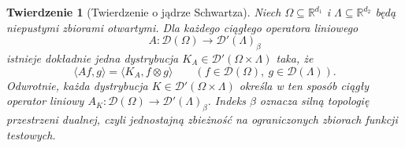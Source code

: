 \documentclass[11pt,a4paper]{article}
\numberwithin{equation}{section}
\theoremstyle{plain}
\newtheorem{twierdzenie}{Twierdzenie}[section]
\theoremstyle{definition}
\theoremstyle{remark}
\newcommand{\R}{\mathbb R}
\begin{document}
\begin{twierdzenie}[Twierdzenie o jądrze Schwartza]
\label{thm:schwartz-kernel23}
Niech $\Omega\subseteq\R^{d_1}$ i
$\Lambda\subseteq\R^{d_2}$ będą niepustymi zbiorami
otwartymi. Dla każdego ciągłego operatora liniowego
\[
 A:\mathcal D(\Omega)\longrightarrow
 \mathcal D'(\Lambda)_\beta
\]
istnieje dokładnie jedna dystrybucja
$K_A\in\mathcal D'(\Omega\times\Lambda)$ taka, że
\[
 \langle Af,g\rangle=\langle K_A,f\otimes g\rangle
 \qquad(f\in\mathcal D(\Omega),\ g\in\mathcal D(\Lambda)).
\]
Odwrotnie, każda dystrybucja
$K\in\mathcal D'(\Omega\times\Lambda)$ określa w ten
sposób ciągły operator liniowy
$A_K:\mathcal D(\Omega)\to\mathcal D'(\Lambda)_\beta$.
Indeks $\beta$ oznacza silną topologię przestrzeni dualnej,
czyli jednostajną zbieżność na ograniczonych zbiorach
funkcji testowych.
\end{twierdzenie}
\end{document}
